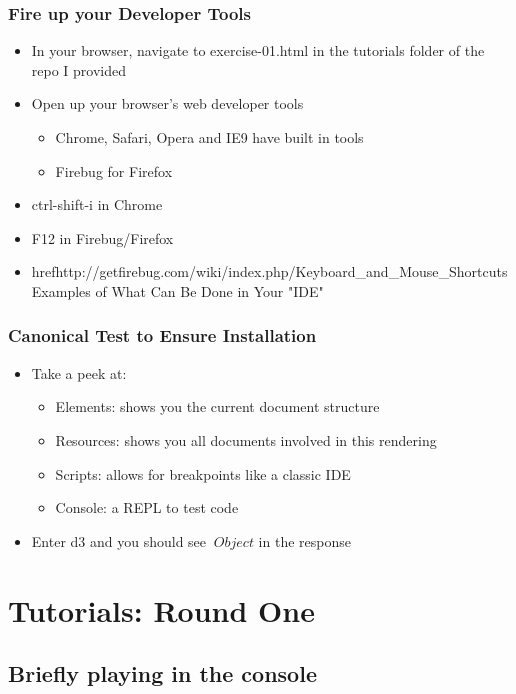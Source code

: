 \documentclass{beamer}
\begin{document}
\begin{frame}
    \frametitle{Fire up your Developer Tools}
    \begin{itemize}
\pause
    \item In your browser, navigate to exercise-01.html in the tutorials folder of the repo I provided
\pause
    \item Open up your browser's web developer tools
        \begin{itemize}
        \item Chrome, Safari, Opera and IE9 have built in tools
        \item Firebug for Firefox
        \end{itemize}
\pause
    \item ctrl-shift-i in Chrome
    \item F12 in Firebug/Firefox
    \item href{http://getfirebug.com/wiki/index.php/Keyboard\_and\_Mouse\_Shortcuts}{Examples of What Can Be Done in Your "IDE"}
    \end{itemize}
\end{frame}


\begin{frame}
    \frametitle{Canonical Test to Ensure Installation}
    \begin{itemize}
\pause
    \item Take a peek at:
        \begin{itemize}
        \item Elements: shows you the current document structure
\pause
        \item Resources: shows you all documents involved in this rendering
\pause
        \item Scripts: allows for breakpoints like a classic IDE
\pause
        \item Console: a REPL to test code
\pause
        \end{itemize}
    \item Enter d3 and you should see $\> Object $ in the response
    \end{itemize}
\end{frame}




\section{Tutorials: Round One}


\subsection{Briefly playing in the console}
\end{document}
